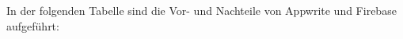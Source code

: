 In der folgenden Tabelle sind die Vor- und Nachteile von Appwrite und Firebase aufgeführt:












